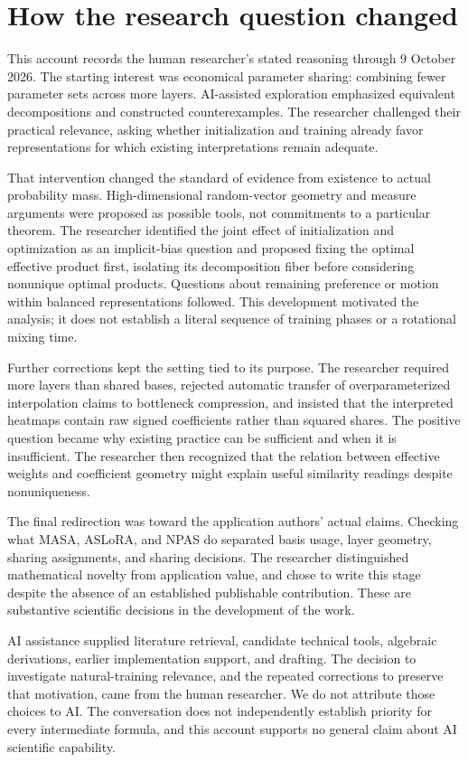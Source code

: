 \section{How the research question changed}
This account records the human researcher's stated reasoning through 9 October 2026. The starting interest was economical parameter sharing: combining fewer parameter sets across more layers. AI-assisted exploration emphasized equivalent decompositions and constructed counterexamples. The researcher challenged their practical relevance, asking whether initialization and training already favor representations for which existing interpretations remain adequate.

That intervention changed the standard of evidence from existence to actual probability mass. High-dimensional random-vector geometry and measure arguments were proposed as possible tools, not commitments to a particular theorem. The researcher identified the joint effect of initialization and optimization as an implicit-bias question and proposed fixing the optimal effective product first, isolating its decomposition fiber before considering nonunique optimal products. Questions about remaining preference or motion within balanced representations followed. This development motivated the analysis; it does not establish a literal sequence of training phases or a rotational mixing time.

Further corrections kept the setting tied to its purpose. The researcher required more layers than shared bases, rejected automatic transfer of overparameterized interpolation claims to bottleneck compression, and insisted that the interpreted heatmaps contain raw signed coefficients rather than squared shares. The positive question became why existing practice can be sufficient and when it is insufficient. The researcher then recognized that the relation between effective weights and coefficient geometry might explain useful similarity readings despite nonuniqueness.

The final redirection was toward the application authors' actual claims. Checking what MASA, ASLoRA, and NPAS do separated basis usage, layer geometry, sharing assignments, and sharing decisions. The researcher distinguished mathematical novelty from application value, and chose to write this stage despite the absence of an established publishable contribution. These are substantive scientific decisions in the development of the work.

AI assistance supplied literature retrieval, candidate technical tools, algebraic derivations, earlier implementation support, and drafting. The decision to investigate natural-training relevance, and the repeated corrections to preserve that motivation, came from the human researcher. We do not attribute those choices to AI. The conversation does not independently establish priority for every intermediate formula, and this account supports no general claim about AI scientific capability.


